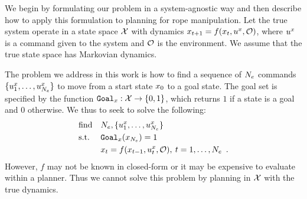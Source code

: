 We begin by formulating our problem in a system-agnostic way and then describe how to apply this formulation to planning for rope manipulation. Let the true system operate in a state space $\mathcal{X}$ with dynamics $x_{t+1} = f(x_t,u^x,\mathcal{O})$, where $u^x$ is a command given to the system and $\mathcal{O}$ is the environment. We assume that the true state space has Markovian dynamics. 

The problem we address in this work is how to find a sequence of $N_e$ commands $\{u^x_1, \dots, u^x_{N_e} \}$ to move from a start state $x_0$ to a goal state. The goal set is specified by the function $\texttt{Goal}_x: \mathcal{X} \rightarrow \{ 0,1 \}$, which returns $1$ if a state is a goal and $0$ otherwise. We thus to seek to solve the following:
\begin{equation}
    \begin{aligned}
        & \text{find}   & & N_e, \{u^x_1, \dots, u^x_{N_e} \} \\
        & \text{s.t.}   & & \texttt{Goal}_x(x_{N_e}) = 1\\ 
        &               & & x_t = f(x_{t-1}, u^x_t,\mathcal{O}), \:  t = 1, \dots, N_e \enspace . \\
    \end{aligned}
    \label{eqn:main_planning_problem}
\end{equation}
However, $f$ may not be known in closed-form or it may be expensive to evaluate within a planner. Thus we cannot solve this problem by planning in $\mathcal{X}$ with the true dynamics.

